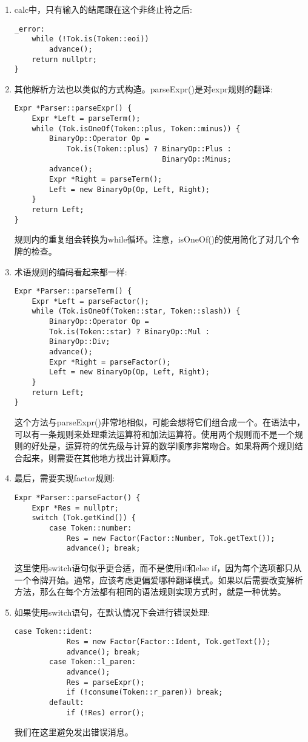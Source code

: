 \begin{enumerate}
\item calc中，只有输入的结尾跟在这个非终止符之后:
\begin{lstlisting}[caption={}]
_error:
	while (!Tok.is(Token::eoi))
		advance();
	return nullptr;
}
\end{lstlisting}

\item 其他解析方法也以类似的方式构造。parseExpr()是对expr规则的翻译:
\begin{lstlisting}[caption={}]
Expr *Parser::parseExpr() {
	Expr *Left = parseTerm();
	while (Tok.isOneOf(Token::plus, Token::minus)) {
		BinaryOp::Operator Op =
			Tok.is(Token::plus) ? BinaryOp::Plus :
								  BinaryOp::Minus;
		advance();
		Expr *Right = parseTerm();
		Left = new BinaryOp(Op, Left, Right);
	}
	return Left;
}
\end{lstlisting}
规则内的重复组会转换为while循环。注意，isOneOf()的使用简化了对几个令牌的检查。

\item 术语规则的编码看起来都一样:
\begin{lstlisting}[caption={}]
Expr *Parser::parseTerm() {
	Expr *Left = parseFactor();
	while (Tok.isOneOf(Token::star, Token::slash)) {
		BinaryOp::Operator Op =
		Tok.is(Token::star) ? BinaryOp::Mul :
		BinaryOp::Div;
		advance();
		Expr *Right = parseFactor();
		Left = new BinaryOp(Op, Left, Right);
	}
	return Left;
}
\end{lstlisting}
这个方法与parseExpr()非常地相似，可能会想将它们组合成一个。在语法中，可以有一条规则来处理乘法运算符和加法运算符。使用两个规则而不是一个规则的好处是，运算符的优先级与计算的数学顺序非常吻合。如果将两个规则结合起来，则需要在其他地方找出计算顺序。

\item 最后，需要实现factor规则:
\begin{lstlisting}[caption={}]
Expr *Parser::parseFactor() {
	Expr *Res = nullptr;
	switch (Tok.getKind()) {
		case Token::number:
			Res = new Factor(Factor::Number, Tok.getText());
			advance(); break;
\end{lstlisting}
这里使用switch语句似乎更合适，而不是使用if和else if，因为每个选项都只从一个令牌开始。通常，应该考虑更偏爱哪种翻译模式。如果以后需要改变解析方法，那么在每个方法都有相同的语法规则实现方式时，就是一种优势。

\item 如果使用switch语句，在默认情况下会进行错误处理:
\begin{lstlisting}[caption={}]
		case Token::ident:
			Res = new Factor(Factor::Ident, Tok.getText());
			advance(); break;
		case Token::l_paren:
			advance();
			Res = parseExpr();
			if (!consume(Token::r_paren)) break;
		default:
			if (!Res) error();
\end{lstlisting}
我们在这里避免发出错误消息。


\end{enumerate}
